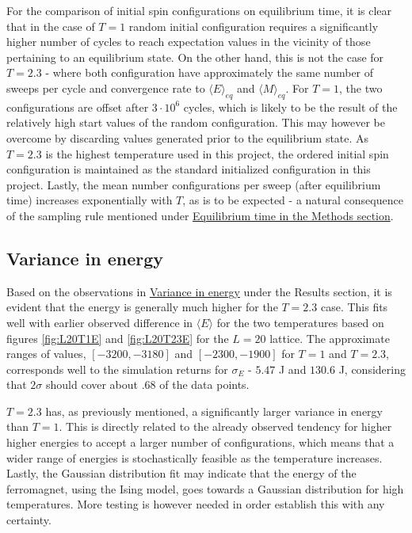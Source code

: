 \documentclass[%
oneside,                 %
final,                   %
10pt]{article}
\begin{document}
For the comparison of initial spin configurations on equilibrium time, it is clear that in the case of $T=1$ random initial configuration requires a significantly higher number of cycles to reach expectation values in the vicinity of those pertaining to an equilibrium state. On the other hand, this is not the case for $T=2.3$ - where both configuration have approximately the same number of sweeps per cycle and convergence rate to $\langle E \rangle_{eq}$ and $\langle M \rangle_{eq}$. For $T=1$, the two configurations are offset after $3\cdot 10^6$ cycles, which is likely to be the result of the relatively high start values of the random configuration. This may however be overcome by discarding values generated prior to the equilibrium state. As $T=2.3$ is the highest temperature used in this project, the ordered initial spin configuration is maintained as the standard initialized configuration in this project. Lastly, the mean number configurations per sweep (after equilibrium time) increases exponentially with $T$, as is to be expected - a natural consequence of the sampling rule mentioned under \hyperref[SS:M.Eq.time]{Equilibrium time in the Methods section}.

\subsection{Variance in energy}
\label{SS.disc.var}
Based on the observations in \hyperref[SS:results.VAR]{Variance in energy} under the Results section, it is evident that the energy is generally much higher for the $T=2.3$ case. This fits well with earlier observed difference in $\langle E \rangle$ for the two temperatures based on figures \ref{fig:L20T1E} and \ref{fig:L20T23E} for the $L=20$ lattice. The approximate ranges of values, $[-3200,-3180]$ and $[-2300,-1900]$ for $T=1$ and $T=2.3$, corresponds well to the simulation returns for $\sigma_E$ - $5.47$ J and $130.6$ J, considering that $2\sigma$ should cover about $.68$ of the data points.  \newline

$T=2.3$ has, as previously mentioned, a significantly larger variance in energy than $T=1$. This is directly related to the already observed tendency for higher higher energies to accept a larger number of configurations, which means that a wider range of energies is stochastically feasible as the temperature increases. Lastly, the Gaussian distribution fit may indicate that the energy of the ferromagnet, using the Ising model, goes towards a Gaussian distribution for high temperatures. More testing is however needed in order establish this with any certainty.
\end{document}

